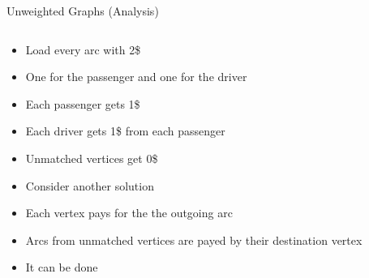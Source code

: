 \begin{frame}{Unweighted Graphs (Analysis)}
\begin{columns}
	\begin{column}{.5\textwidth}
	\begin{itemize}
	  \item Load every arc with 2\$
	  \item One for the passenger and one for the driver
	  \item Each passenger gets 1\$
	  \item Each driver gets 1\$ from each passenger
	  \item Unmatched vertices get 0\$
	\end{itemize}
	\begin{itemize}
	  \item Consider another solution
	  \item Each vertex pays for the the outgoing arc
	  \item Arcs from unmatched vertices are payed by their destination vertex
	  \item It can be done 
	\end{itemize}
	\end{column}
	\begin{column}{.5\textwidth}
	\centering
	
	\end{column}
\end{columns}
\end{frame}